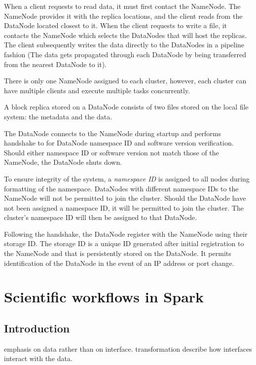 \documentclass{report}
\begin{document}
        When a client requests to read data, it must first contact 
        the NameNode. The NameNode provides it with the replica 
        locations, and the client reads from the DataNode located 
        closest to it. When the client requests to write a file, it
        contacts the NameNode which selects the DataNodes that will 
        host the replicas. The client subsequently writes the data 
        directly to the DataNodes in a pipeline fashion (The data 
        gets propagated through each DataNode by being transferred
        from the nearest DataNode to it).

        There is only one NameNode assigned to each cluster, however, 
        each cluster can have multiple clients and execute multiple 
        tasks concurrently.


        A block replica stored on a DataNode consists of two files 
        stored on the local file system: the metadata and the data. 

        The DataNode connects to the NameNode during startup and 
        performs handshake to for DataNode namespace ID and 
        software version verification. Should either namespace ID 
        or software version not match those of the NameNode, the 
        DataNode shuts down.

        To ensure integrity of the system, a \textit{namespace ID} 
        is assigned to all nodes during formatting of the namespace. 
        DataNodes with different namespace IDs to the NameNode will 
        not be permitted to join the cluster. Should the DataNode
        have not been assigned a namespace ID, it will be permitted 
        to join the cluster. The cluster's namespace ID will then be 
        assigned to that DataNode.


        Following the handshake, the DataNode register with the 
        NameNode using their storage ID. The storage ID is a unique 
        ID generated after initial registration to the NameNode and 
        that is persistently stored on the DataNode. It permits
        identification of the DataNode in the event of an IP address 
        or port change. 
        
\chapter{Scientific workflows in Spark}
    \section{Introduction}
    emphasis on data rather than on interface. transformation describe how
interfaces interact with the data. 
\end{document}
